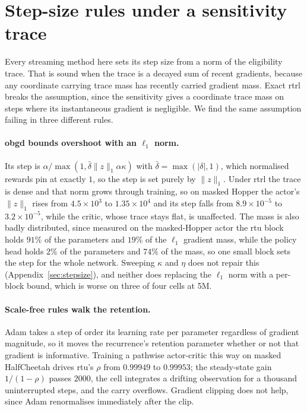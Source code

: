 \documentclass{article}
\begin{document}
\section{Step-size rules under a sensitivity trace}
\label{sec:stepsize-analysis}

Every streaming method here sets its step size from a norm of the eligibility trace. That is
sound when the trace is a decayed sum of recent gradients, because any coordinate carrying
trace mass has recently carried gradient mass. Exact \gls{rtrl} breaks the assumption, since the
sensitivity gives a coordinate trace mass on steps where its instantaneous gradient is
negligible. We find the same assumption failing in three different rules.

\paragraph{\gls{obgd} bounds overshoot with an $\ell_1$ norm.} Its step is
$\alpha/\max(1, \bar{\delta}\|z\|_1 \alpha \kappa)$ with $\bar{\delta} = \max(|\delta|, 1)$,
which normalised rewards pin at exactly $1$, so the step is set purely by $\|z\|_1$. Under
\gls{rtrl} the trace is dense and that norm grows through training, so on masked Hopper the
actor's $\|z\|_1$ rises from $4.5\times10^3$ to $1.35\times10^4$ and its step falls from
$8.9\times10^{-5}$ to $3.2\times10^{-5}$, while the critic, whose trace stays flat, is
unaffected. The mass is also badly distributed, since measured on the masked-Hopper actor the
\gls{rtu} block holds $91\%$ of the parameters and $19\%$ of the $\ell_1$ gradient mass, while
the policy head holds $2\%$ of the parameters and $74\%$ of the mass, so one small block sets
the step for the whole network. Sweeping $\kappa$ and $\eta$ does not repair this
(Appendix~\ref{sec:stepsize}), and neither does replacing the $\ell_1$ norm with a per-block
bound, which is worse on three of four cells at 5M.

\paragraph{Scale-free rules walk the retention.} Adam takes a step of order its learning rate
per parameter regardless of gradient magnitude, so it moves the recurrence's retention
parameter whether or not that gradient is informative. Training a pathwise actor-critic this
way on masked HalfCheetah drives \gls{rtu}'s $\rho$ from $0.99949$ to $0.99953$; the
steady-state gain $1/(1-\rho)$ passes $2000$, the cell integrates a drifting observation for a
thousand uninterrupted steps, and the carry overflows. Gradient clipping does not help, since
Adam renormalises immediately after the clip.
\end{document}
